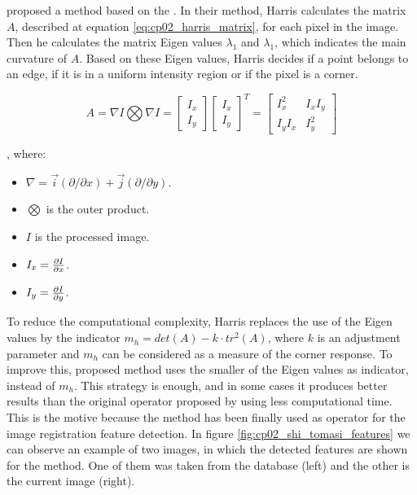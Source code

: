 \cite{shi1994good} proposed a method based on the \cite{harris1988combined}. In their method, Harris calculates the matrix $A$, described at equation \ref{eq:cp02_harris_matrix}, for each pixel in the image. Then he calculates the matrix Eigen values $\lambda_1$ and $\lambda_1$, which indicates the main curvature of $A$. Based on these Eigen values, Harris decides if a point belongs to an edge, if it is in a uniform intensity region or if the pixel is a corner.

\begin{equation}\label{eq:cp02_harris_matrix}
A = \nabla I \bigotimes \nabla I = 
\left [ \begin{array}{c} I_x \\ I_y \end{array} \right ]
\left [ \begin{array}{c} I_x \\ I_y \end{array} \right ]^T = 
\left [ \begin{array}{cc} 
I_x^2 & I_xI_y \\ 
I_yI_x & I_y^2
\end{array} \right ]
\end{equation}

, where:

\begin{itemize}
 \item $\nabla = \vec{i} (\partial / \partial x) + \vec{j} (\partial / \partial y)$.
 \item $\bigotimes$ is the outer product.
 \item $I$ is the processed image.
 \item $I_x = {{\partial I} \over {\partial x}}$.
 \item $I_y = {{\partial I} \over {\partial y}}$.
\end{itemize}

To reduce the computational complexity, Harris replaces the use of the Eigen values by the indicator $m_h = det(A) − k \cdot tr^2(A)$, where $k$ is an adjustment parameter and $m_h$ can be considered as a measure of the corner response. To improve this, \cite{shi1994good} proposed method uses the smaller of the Eigen values as indicator, instead of $m_h$. This strategy is enough, and in some cases it produces better results than the original operator proposed by \cite{harris1988combined} using less computational time. This is the motive because the \cite{shi1994good} method has been finally used as operator for the image registration feature detection. In figure \ref{fig:cp02_shi_tomasi_features} we can observe an example of two images, in which the detected features are shown for the \cite{shi1994good} method. One of them was taken from the database (left) and the other is the current image (right).

